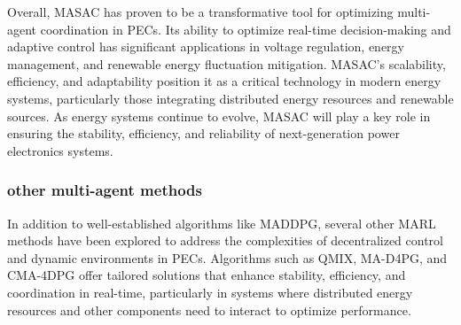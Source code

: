 

Overall, MASAC has proven to be a transformative tool for optimizing multi-agent coordination in PECs. Its ability to optimize real-time decision-making and adaptive control has significant applications in voltage regulation, energy management, and renewable energy fluctuation mitigation. MASAC's scalability, efficiency, and adaptability position it as a critical technology in modern energy systems, particularly those integrating distributed energy resources and renewable sources. As energy systems continue to evolve, MASAC will play a key role in ensuring the stability, efficiency, and reliability of next-generation power electronics systems.

\subsubsection{other multi-agent methods}

In addition to well-established algorithms like MADDPG, several other MARL methods have been explored to address the complexities of decentralized control and dynamic environments in PECs. Algorithms such as QMIX, MA-D4PG, and CMA-4DPG offer tailored solutions that enhance stability, efficiency, and coordination in real-time, particularly in systems where distributed energy resources and other components need to interact to optimize performance.

